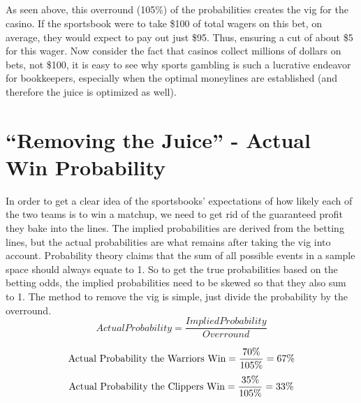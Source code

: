 \documentclass [MS] {uclathes}
\begin{document}
\noindent {} \\
\noindent {} \\
\noindent {} \\
\noindent {} \\
\noindent {} \\
\noindent {} \\
\noindent {} \\
\noindent {} \\
\noindent {} \\


\noindent As seen above, this overround (105\%) of the probabilities creates the vig for the casino. If the sportsbook were to take \$100 of total wagers on this bet, on average, they would expect to pay out just \$95. Thus, ensuring a cut of about \$5 for this wager. Now consider the fact that casinos collect millions of dollars on bets, not \$100, it is easy to see why sports gambling is such a lucrative endeavor for bookkeepers, especially when the optimal moneylines are established (and therefore the juice is optimized as well). \\

\section{``Removing the Juice'' - Actual Win Probability}
In order to get a clear idea of the sportsbooks' expectations of how likely each of the two teams is to win a matchup, we need to get rid of the guaranteed profit they bake into the lines. The implied probabilities are derived from the betting lines, but the actual probabilities are what remains after taking the vig into account. Probability theory claims that the sum of all possible events in a sample space should always equate to 1. So to get the true probabilities based on the betting odds, the implied probabilities need to be skewed so that they also sum to 1. The method to remove the vig is simple, just divide the probability by the overround. \\

$$
\displaystyle
Actual Probability = \frac{Implied Probability}
{Overround}
$$

$$
\text{Actual Probability the Warriors Win} = \frac{70\%}{105\%} = 67\% \\
$$
$$
\text{Actual Probability the Clippers Win} = \frac{35\%}{105\%} = 33\% \\
$$
\end{document}
